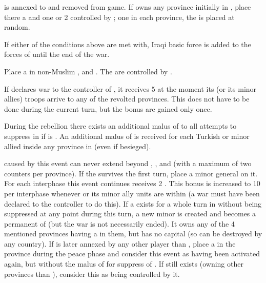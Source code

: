 
\phevnt
\aparag \paysIrak is annexed to \paysperse and removed from game.
\aparag If \TUR owns any province initially in \paysIrak, place there a
\REVOLT \faceplus and one or 2 \REVOLT \facemoins controlled by \paysperse;
one \REVOLT in each province, the \REVOLT \faceplus is placed at random.

\phadm
\aparag If either of the conditions above are met with, Iraqi basic force is
added to the forces of \paysperse until the end of the war.





\phevnt
\aparag Place a \REVOLT \facemoins in non-Muslim \provinceGranada,
\provinceCordoba and . The \REVOLT are controlled by \TUR.

\phdipl
\aparag If \TUR declares war to the controller of \provinceGranada, it
receives 5 \VP at the moment its (or its minor allies) troops arrive to any of
the revolted provinces. This does not have to be done during the current turn,
but the bonus \VP are gained only once.

\phmil
\aparag During the rebellion there exists an additional malus of  to
all attempts to suppress \REVOLT in \provinceGranada if \SPA is \CATHCR. An
additional malus of  is received for each Turkish or minor allied
\LD inside any province in \REVOLT (even if besieged).

\phinter
\aparag \REVOLT caused by this event can never extend beyond \provinceGranada,
\provinceCordoba, \provinceMurcia and  (with a maximum of
two \REVOLT counters per province).
\aparag If the \REVOLT survives the first turn, place a minor general on it.
\aparag For each interphase this event continues \TUR receives 2 \VP.  This
bonus is increased to 10 \VP per interphase whenever \TUR or its minor ally
units are within \provinceGranada (a war must have been declared to the
controller to do this).
\aparag If a \REVOLT \faceplus exists for a whole turn in \provinceGranada
without being suppressed at any point during this turn, a new minor
\paysGrenade is created and becomes a permanent \VASSAL of \TUR (but the war
is not necessarily ended). It owns any of the 4 mentioned provinces having a
\REVOLT in them, but has no capital (so can be destroyed by any country).
\aparag If \provinceGranada is later annexed by any other player than \TUR,
place a \REVOLT \facemoins in the province during the peace phase and consider
this event as having been activated again, but without the malus of 
for suppress of \REVOLT . If \paysGrenade still exists (owning other provinces
than \provinceGranada), consider this \REVOLT as being controlled by it.



